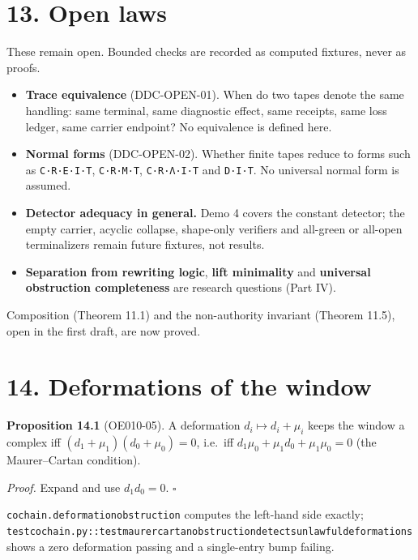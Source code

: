 \documentclass[
  11pt,
]{article}
\providecommand{\tightlist}{%
  \setlength{\itemsep}{0pt}\setlength{\parskip}{0pt}}
\renewcommand{\_}{\ddcunderscore\allowbreak}
\begin{document}
\section{13. Open laws}\label{open-laws}

These remain open. Bounded checks are recorded as computed fixtures,
never as proofs.

\begin{itemize}
\tightlist
\item
  \textbf{Trace equivalence} (DDC-OPEN-01). When do two tapes denote the
  same handling: same terminal, same diagnostic effect, same receipts,
  same loss ledger, same carrier endpoint? No equivalence is defined
  here.
\item
  \textbf{Normal forms} (DDC-OPEN-02). Whether finite tapes reduce to
  forms such as \texttt{C·R·E·I·T}, \texttt{C·R·M·T}, \texttt{C·R·Λ·I·T}
  and \texttt{D·I·T}. No universal normal form is assumed.
\item
  \textbf{Detector adequacy in general.} Demo 4 covers the constant
  detector; the empty carrier, acyclic collapse, shape-only verifiers
  and all-green or all-open terminalizers remain future fixtures, not
  results.
\item
  \textbf{Separation from rewriting logic}, \textbf{lift minimality} and
  \textbf{universal obstruction completeness} are research questions
  (Part IV).
\end{itemize}

Composition (Theorem 11.1) and the non-authority invariant (Theorem
11.5), open in the first draft, are now proved.

\section{14. Deformations of the
window}\label{deformations-of-the-window}

\textbf{Proposition 14.1} (OE010-05). A deformation
\(d_i \mapsto d_i + \mu_i\) keeps the window a complex iff
\((d_1 + \mu_1)(d_0 + \mu_0) = 0\), i.e.~iff
\(d_1 \mu_0 + \mu_1 d_0 + \mu_1 \mu_0 = 0\) (the Maurer--Cartan
condition).

\emph{Proof.} Expand and use \(d_1 d_0 = 0\). \(\square\)

\texttt{cochain.\allowbreak deformation\_obstruction} computes the left-hand side
exactly;
\texttt{test\_cochain.\allowbreak py::test\_maurer\_cartan\_obstruction\_detects\_unlawful\_deformations}
shows a zero deformation passing and a single-entry bump failing.
\end{document}

